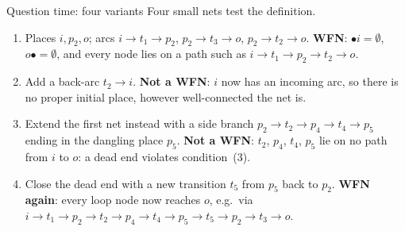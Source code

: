 \begin{examplebox}{Question time: four variants}
Four small nets test the definition.
\begin{enumerate}
  \item Places $i, p_2, o$; arcs $i \to t_1 \to p_2$, $p_2 \to t_3 \to o$, $p_2 \to t_2 \to o$. \textbf{WFN}: $\bullet i = \emptyset$, $o\bullet = \emptyset$, and every node lies on a path such as $i \to t_1 \to p_2 \to t_2 \to o$.
  \item Add a back-arc $t_2 \to i$. \textbf{Not a WFN}: $i$ now has an incoming arc, so there is no proper initial place, however well-connected the net is.
  \item Extend the first net instead with a side branch $p_2 \to t_2 \to p_4 \to t_4 \to p_5$ ending in the dangling place $p_5$. \textbf{Not a WFN}: $t_2$, $p_4$, $t_4$, $p_5$ lie on no path from $i$ to $o$: a dead end violates condition~(3).
  \item Close the dead end with a new transition $t_5$ from $p_5$ back to $p_2$. \textbf{WFN again}: every loop node now reaches $o$, e.g.\ via $i \to t_1 \to p_2 \to t_2 \to p_4 \to t_4 \to p_5 \to t_5 \to p_2 \to t_3 \to o$.
\end{enumerate}


\end{examplebox}
